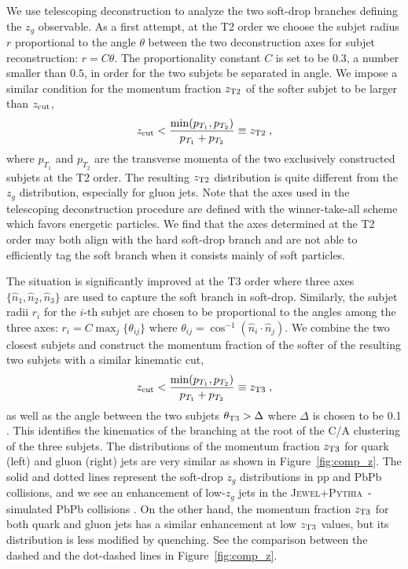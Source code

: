\documentclass[notoc]{JHEP3}
\newcommand{\jwpy}{\textsc{Jewel+Pythia}~}
\begin{document}
We use telescoping deconstruction to analyze the two soft-drop branches defining the $z_g$ observable. As a first attempt, at the T2 order we choose the subjet radius $r$ proportional to the angle $\theta$ between the two deconstruction axes for subjet reconstruction: $r=C \theta$. The proportionality constant $C$ is set to be 0.3, a number smaller than $0.5$, in order for the two subjets be separated in angle. We impose a similar condition for the momentum fraction $z_{\rm T2}$ of the softer subjet to be larger than $z_{\rm cut}$,
\begin{equation}
    z_{\rm cut} < \frac{\min(p_{T_1},p_{T_2})}{p_{T_1}+p_{T_2}} \equiv z_{\rm T2}\;,
\label{T2_z}
\end{equation}
where $p_{T_1}$ and $p_{T_2}$ are the transverse momenta of the two exclusively constructed subjets at the T2 order. The resulting $z_{\rm T2}$ distribution is quite different from the $z_g$ distribution, especially for gluon jets.  Note that the axes used in the telescoping deconstruction procedure are defined with the winner-take-all scheme which favors energetic particles. We find that the axes determined at the T2 order may both align with the hard soft-drop branch and are not able to efficiently tag the soft branch when it consists mainly of soft particles.

The situation is significantly improved at the T3 order where three axes $\{\hat n_1,\hat n_2,\hat n_3\}$ are used to capture the soft branch in soft-drop. Similarly, the subjet radii $r_i$ for the $i$-th subjet are chosen to be proportional to the angles among the three axes: $r_i = C \max_{j} \{\theta_{ij}\}$ where $\theta_{ij}=\cos^{-1}(\hat n_i\cdot\hat n_j)$. We combine the two closest subjets and construct the momentum fraction of the softer of the resulting two subjets with a similar kinematic cut,
\begin{equation}
    z_{\rm cut} < \frac{\min(p_{T_1},p_{T_2})}{p_{T_1}+p_{T_2}} \equiv z_{\rm T3}\;,
\label{T3_z}
\end{equation}
as well as the angle between the two subjets $\theta_{\rm T3} > \Delta$ where $\Delta$ is chosen to be 0.1 \cite{Sirunyan:2017bsd}. This identifies the kinematics of the branching at the root of the C/A clustering of the three subjets. The distributions of the momentum fraction $z_{\rm T3}$ for quark (left) and gluon (right) jets are very similar as shown in Figure~\ref{fig:comp_z}. The solid and dotted lines represent the soft-drop $z_{g}$ distributions in pp and PbPb collisions, and we see an enhancement of low-$z_g$ jets in the \jwpy-simulated PbPb collisions \cite{Milhano:2017nzm}. On the other hand, the momentum fraction $z_{\rm T3}$ for both quark and gluon jets has a similar enhancement at low $z_{\rm T3}$ values, but its distribution is less modified by quenching. See the comparison between the dashed and the dot-dashed lines in Figure~\ref{fig:comp_z}.
\end{document}
